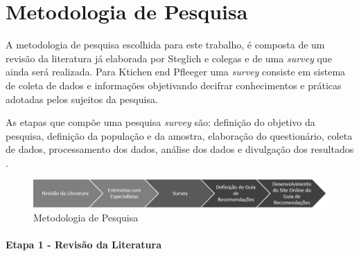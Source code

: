 \chapter{\label{chap:intro}Metodologia de Pesquisa}

A metodologia de pesquisa escolhida para este trabalho, é composta de um revisão da literatura já elaborada por Steglich e colegas \cite{caio2019} e de uma \textit{survey} que ainda será realizada. Para Ktichen end Pfleeger \cite{pfleeger2001principles} uma \textit{survey} consiste em sistema de coleta de dados e informações objetivando decifrar conhecimentos e práticas adotadas pelos sujeitos da pesquisa.
   
As etapas que compõe uma pesquisa \textit{survey} são:  definição do objetivo da pesquisa, definição da população e da amostra, elaboração do questionário, coleta de dados, processamento dos dados, análise dos dados e divulgação dos resultados \cite{vieira2010dicionario}.

\begin{figure}
    \centering
    \includegraphics[scale=0.66]{fig/processo-metodologia.JPG}
    \caption{Metodologia de Pesquisa}
    \label{fig:my_label}
\end{figure}

\subsubsection{\textbf{Etapa 1 - Revisão da Literatura}}



